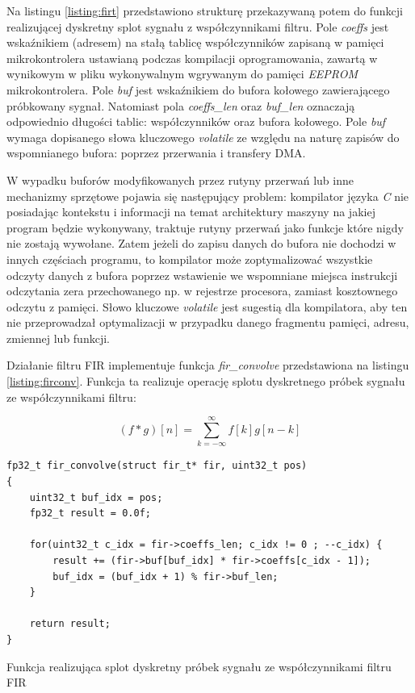 Na listingu \ref{listing:firt} przedstawiono strukturę przekazywaną potem do funkcji realizującej dyskretny splot sygnału z
współczynnikami filtru. Pole \textit{coeffs} jest wskaźnikiem (adresem) na stałą tablicę współczynników zapisaną w pamięci
mikrokontrolera ustawianą podczas kompilacji oprogramowania, zawartą w wynikowym w pliku wykonywalnym wgrywanym do pamięci 
\textit{EEPROM} mikrokontrolera. Pole \textit{buf} jest wskaźnikiem do bufora kołowego zawierającego próbkowany sygnał.
Natomiast pola \textit{coeffs\_len} oraz \textit{buf\_len} oznaczają odpowiednio długości tablic: 
współczynników oraz bufora kołowego.
Pole \textit{buf} wymaga dopisanego słowa kluczowego \textit{volatile} ze względu na naturę zapisów do wspomnianego bufora: poprzez
przerwania i transfery DMA. 


W wypadku buforów modyfikowanych przez rutyny przerwań lub inne mechanizmy sprzętowe 
pojawia się następujący problem: kompilator języka \textit{C} nie posiadając kontekstu i informacji na temat architektury maszyny
na jakiej program będzie wykonywany, traktuje rutyny przerwań jako funkcje które nigdy nie zostają wywołane. Zatem jeżeli do zapisu
danych do bufora nie dochodzi w innych częściach programu, to kompilator może zoptymalizować wszystkie odczyty danych 
z bufora poprzez wstawienie we wspomniane miejsca instrukcji odczytania zera przechowanego np. w rejestrze procesora, 
zamiast kosztownego odczytu z pamięci. Słowo kluczowe \textit{volatile} jest sugestią dla kompilatora, aby ten nie przeprowadzał
optymalizacji w przypadku danego fragmentu pamięci, adresu, zmiennej lub funkcji.


Działanie filtru FIR implementuje funkcja \textit{fir\_convolve} przedstawiona na listingu \ref{listing:firconv}. 
Funkcja ta realizuje operację splotu dyskretnego próbek sygnału ze współczynnikami filtru:

$$
(f * g)[n] = \sum_{k=-\infty}^{\infty} f[k]g[n-k]
$$

\begin{listing}
\begin{verbatim}
fp32_t fir_convolve(struct fir_t* fir, uint32_t pos)
{ 
    uint32_t buf_idx = pos; 
    fp32_t result = 0.0f;
  
    for(uint32_t c_idx = fir->coeffs_len; c_idx != 0 ; --c_idx) { 
        result += (fir->buf[buf_idx] * fir->coeffs[c_idx - 1]);
        buf_idx = (buf_idx + 1) % fir->buf_len;
    }     
  
    return result;
} 
\end{verbatim} 
\caption{Funkcja realizująca splot dyskretny próbek sygnału ze współczynnikami filtru FIR}
\label{listing:firconv}
\end{listing}

